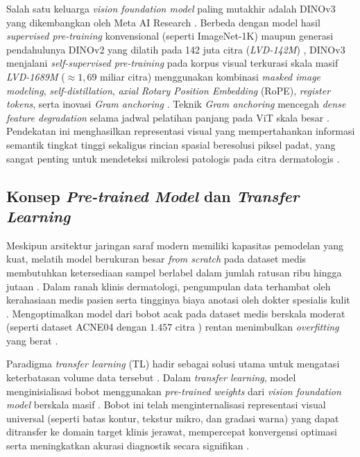 Salah satu keluarga \textit{vision foundation model} paling mutakhir adalah DINOv3 yang dikembangkan oleh Meta AI Research \cite{simeoni2025dinov3}. Berbeda dengan model hasil \textit{supervised pre-training} konvensional (seperti ImageNet-1K) maupun generasi pendahulunya DINOv2 yang dilatih pada 142 juta citra (\textit{LVD-142M}) \cite{oquab2023dinov2}, DINOv3 menjalani \textit{self-supervised pre-training} pada korpus visual terkurasi skala masif \textit{LVD-1689M} ($\approx 1,69$ miliar citra) menggunakan kombinasi \textit{masked image modeling}, \textit{self-distillation}, \textit{axial Rotary Position Embedding} (RoPE), \textit{register tokens}, serta inovasi \textit{Gram anchoring} \cite{simeoni2025dinov3}. Teknik \textit{Gram anchoring} mencegah \textit{dense feature degradation} selama jadwal pelatihan panjang pada ViT skala besar \cite{simeoni2025dinov3}. Pendekatan ini menghasilkan representasi visual yang mempertahankan informasi semantik tingkat tinggi sekaligus rincian spasial beresolusi piksel padat, yang sangat penting untuk mendeteksi mikrolesi patologis pada citra dermatologis \cite{simeoni2025dinov3}.

\subsection{Konsep \textit{Pre-trained Model} dan \textit{Transfer Learning}}
Meskipun arsitektur jaringan saraf modern memiliki kapasitas pemodelan yang kuat, melatih model berukuran besar \textit{from scratch} pada dataset medis membutuhkan ketersediaan sampel berlabel dalam jumlah ratusan ribu hingga jutaan \cite{jain2021, jeong2023}. Dalam ranah klinis dermatologi, pengumpulan data terhambat oleh kerahasiaan medis pasien serta tingginya biaya anotasi oleh dokter spesialis kulit \cite{jeong2023, davila2024}. Mengoptimalkan model dari bobot acak pada dataset medis berskala moderat (seperti dataset ACNE04 dengan $1.457$ citra \cite{wu2019, layeredlabs2026acne04}) rentan menimbulkan \textit{overfitting} yang berat \cite{jain2021}.

Paradigma \textit{transfer learning} (TL) hadir sebagai solusi utama untuk mengatasi keterbatasan volume data tersebut \cite{jain2021, davila2024}. Dalam \textit{transfer learning}, model menginisialisasi bobot menggunakan \textit{pre-trained weights} dari \textit{vision foundation model} berskala masif \cite{simeoni2025dinov3}. Bobot ini telah menginternalisasi representasi visual universal (seperti batas kontur, tekstur mikro, dan gradasi warna) yang dapat ditransfer ke domain target klinis jerawat, mempercepat konvergensi optimasi serta meningkatkan akurasi diagnostik secara signifikan \cite{davila2024}.

